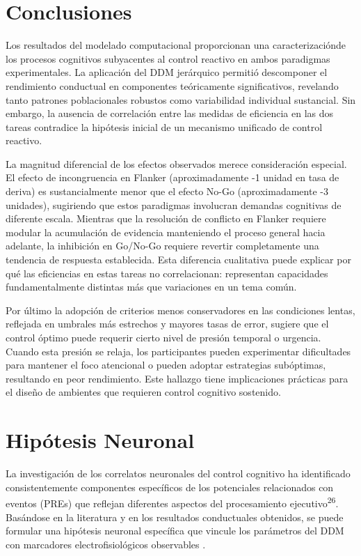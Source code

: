 \documentclass[
  spanish,
  10pt,
]{article}
\begin{document}
\section{Conclusiones}\label{conclusiones}

Los resultados del modelado computacional proporcionan una
caracterizaciónde los procesos cognitivos subyacentes al control
reactivo en ambos paradigmas experimentales. La aplicación del DDM
jerárquico permitió descomponer el rendimiento conductual en componentes
teóricamente significativos, revelando tanto patrones poblacionales
robustos como variabilidad individual sustancial. Sin embargo, la
ausencia de correlación entre las medidas de eficiencia en las dos
tareas contradice la hipótesis inicial de un mecanismo unificado de
control reactivo.

La magnitud diferencial de los efectos observados merece consideración
especial. El efecto de incongruencia en Flanker (aproximadamente -1
unidad en tasa de deriva) es sustancialmente menor que el efecto No-Go
(aproximadamente -3 unidades), sugiriendo que estos paradigmas
involucran demandas cognitivas de diferente escala. Mientras que la
resolución de conflicto en Flanker requiere modular la acumulación de
evidencia manteniendo el proceso general hacia adelante, la inhibición
en Go/No-Go requiere revertir completamente una tendencia de respuesta
establecida. Esta diferencia cualitativa puede explicar por qué las
eficiencias en estas tareas no correlacionan: representan capacidades
fundamentalmente distintas más que variaciones en un tema común.

Por último la adopción de criterios menos conservadores en las
condiciones lentas, reflejada en umbrales más estrechos y mayores tasas
de error, sugiere que el control óptimo puede requerir cierto nivel de
presión temporal o urgencia. Cuando esta presión se relaja, los
participantes pueden experimentar dificultades para mantener el foco
atencional o pueden adoptar estrategias subóptimas, resultando en peor
rendimiento. Este hallazgo tiene implicaciones prácticas para el diseño
de ambientes que requieren control cognitivo sostenido.

\section{Hipótesis Neuronal}\label{hipuxf3tesis-neuronal}

La investigación de los correlatos neuronales del control cognitivo ha
identificado consistentemente componentes específicos de los potenciales
relacionados con eventos (PREs) que reflejan diferentes aspectos del
procesamiento ejecutivo\textsuperscript{26}. Basándose en la literatura
y en los resultados conductuales obtenidos, se puede formular una
hipótesis neuronal específica que vincule los parámetros del DDM con
marcadores electrofisiológicos observables .
\end{document}
